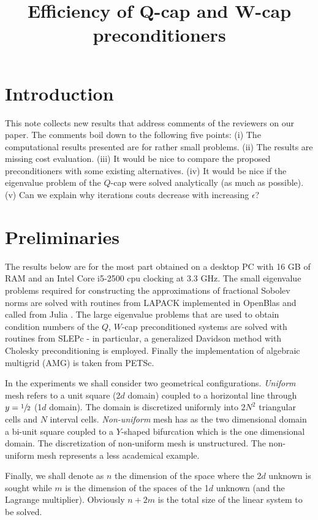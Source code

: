 \documentclass[10pt, a4paper]{article}
\title{Efficiency of Q-cap and W-cap preconditioners}
\begin{document}
\maketitle

\section*{Introduction}
This note collects new results that address comments of the reviewers on our paper. 
The comments boil down to the following five points: (i) The computational results 
presented are for rather small problems. (ii) The results are missing cost evaluation. 
(iii) It would be nice to compare the proposed preconditioners with some existing 
alternatives. (iv) It would be nice if the eigenvalue problem of the $Q$-cap were solved
analytically (as much as possible). (v) Can we explain why iterations couts
decrease with increasing $\epsilon$?

\section*{Preliminaries}
The results below are for the most part obtained on a desktop PC with 16 GB of RAM 
and an Intel Core i5-2500 cpu clocking at 3.3 GHz. The small eigenvalue problems 
required for constructing the approximations of fractional Sobolev norms are solved 
with routines from LAPACK\cite{lapack} implemented in OpenBlas\cite{openblas}
and called from Julia \cite{julia}. The large eigenvalue problems that are used to 
obtain condition numbers of the $Q$, $W$-cap preconditioned systems are solved with 
routines from SLEPc\cite{slepc} - in particular,
a generalized Davidson method with Cholesky preconditioning is employed. Finally the 
implementation of algebraic multigrid (AMG) is taken from PETSc\cite{petsc}.

In the experiments we shall consider two geometrical configurations. \textit{Uniform}
mesh refers to a unit square (2$d$ domain) coupled to a horizontal line through 
$y=\sfrac{1}{2}$ (1$d$ domain). The domain is discretized uniformly into $2N^2$ 
triangular cells and $N$ interval cells. \textit{Non-uniform} mesh has as the two 
dimensional domain a bi-unit square coupled to a $Y$-shaped bifurcation which
is the one dimensional domain. The discretization of non-uniform mesh is 
unstructured. The non-uniform mesh represents a less academical example.

Finally, we shall denote as $n$ the dimension of the space where the 2$d$ unknown 
is sought while $m$ is the dimension of the spaces of the 1$d$ unknown (and the 
Lagrange multiplier). Obviously $n+2m$ is the total size of the linear system to 
be solved.
\end{document}
